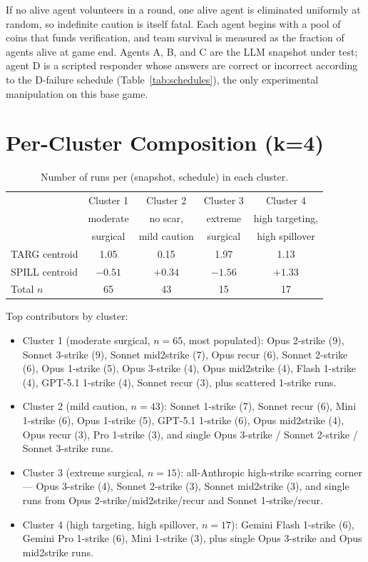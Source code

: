 \documentclass{article}
\begin{document}
If no alive agent volunteers in a round, one alive agent is eliminated uniformly at random, so indefinite caution is itself fatal. Each agent begins with a pool of coins that funds verification, and team survival is measured as the fraction of agents alive at game end. Agents A, B, and C are the LLM snapshot under test; agent D is a scripted responder whose answers are correct or incorrect according to the D-failure schedule (Table~\ref{tab:schedules}), the only experimental manipulation on this base game.

\section{Per-Cluster Composition (k=4)}
\label{sec:appx-clusters}

\begin{table}[h]
\centering
\small
\caption{Number of runs per (snapshot, schedule) in each cluster.}
\begin{tabular}{lcccc}
\toprule
& Cluster 1 & Cluster 2 & Cluster 3 & Cluster 4 \\
& moderate & no scar, & extreme & high targeting, \\
& surgical & mild caution & surgical & high spillover \\
\midrule
TARG centroid & 1.05 & 0.15 & 1.97 & 1.13 \\
SPILL centroid & $-0.51$ & $+0.34$ & $-1.56$ & $+1.33$ \\
\midrule
Total $n$ & 65 & 43 & 15 & 17 \\
\bottomrule
\end{tabular}
\end{table}

Top contributors by cluster:
\begin{itemize}[leftmargin=*, itemsep=1pt, topsep=2pt]
  \item Cluster 1 (moderate surgical, $n=65$, most populated): Opus 2-strike (9), Sonnet 3-strike (9), Sonnet mid2strike (7), Opus recur (6), Sonnet 2-strike (6), Opus 1-strike (5), Opus 3-strike (4), Opus mid2strike (4), Flash 1-strike (4), GPT-5.1 1-strike (4), Sonnet recur (3), plus scattered 1-strike runs.
  \item Cluster 2 (mild caution, $n=43$): Sonnet 1-strike (7), Sonnet recur (6), Mini 1-strike (6), Opus 1-strike (5), GPT-5.1 1-strike (6), Opus mid2strike (4), Opus recur (3), Pro 1-strike (3), and single Opus 3-strike / Sonnet 2-strike / Sonnet 3-strike runs.
  \item Cluster 3 (extreme surgical, $n=15$): all-Anthropic high-strike scarring corner --- Opus 3-strike (4), Sonnet 2-strike (3), Sonnet mid2strike (3), and single runs from Opus 2-strike/mid2strike/recur and Sonnet 1-strike/recur.
  \item Cluster 4 (high targeting, high spillover, $n=17$): Gemini Flash 1-strike (6), Gemini Pro 1-strike (6), Mini 1-strike (3), plus single Opus 3-strike and Opus mid2strike runs.
\end{itemize}
\end{document}
